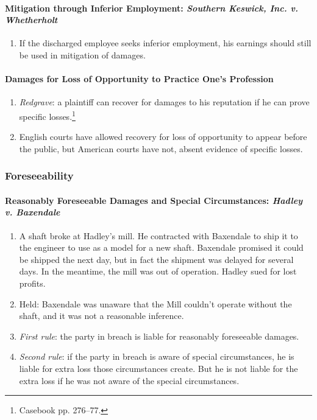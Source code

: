 \paragraph{Mitigation through Inferior Employment: \emph{Southern Keswick, 
Inc. v. Whetherholt}}

\begin{enumerate}
    \item If the discharged employee seeks inferior employment, his earnings 
    should still be used in mitigation of damages.
\end{enumerate}

\paragraph{Damages for Loss of Opportunity to Practice One's Profession}

\begin{enumerate}
    \item \emph{Redgrave}: a plaintiff can recover for damages to his 
    reputation if he can prove specific losses.\footnote{Casebook pp. 276--77.}
    \item English courts have allowed recovery for loss of opportunity to 
    appear before the public, but American courts have not, absent evidence of 
    specific losses.
\end{enumerate}

\subsubsection{Foreseeability}

\paragraph{Reasonably Foreseeable Damages and Special Circumstances: 
\emph{Hadley v. Baxendale}}

\begin{enumerate}
    \item A shaft broke at Hadley's mill. He contracted with Baxendale to ship 
    it to the engineer to use as a model for a new shaft. Baxendale promised 
    it could be shipped the next day, but in fact the shipment was delayed for 
    several days. In the meantime, the mill was out of operation. Hadley sued 
    for lost profits.
    \item Held: Baxendale was unaware that the Mill couldn't operate without 
    the shaft, and it was not a reasonable inference.
    \item \emph{First rule}: the party in breach is liable for reasonably 
    foreseeable damages.
    \item \emph{Second rule}: if the party in breach is aware of special 
    circumstances, he is liable for extra loss those circumstances create. But 
    he is not liable for the extra loss if he was not aware of the special 
    circumstances.
\end{enumerate}

